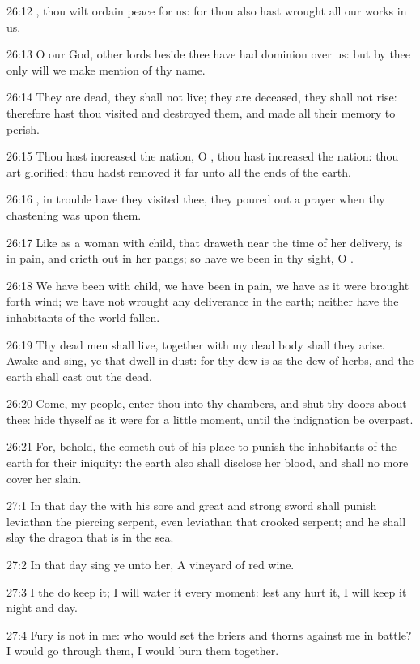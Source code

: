26:12 \LORD, thou wilt ordain peace for us: for thou also hast wrought all our works in us.

26:13 O \LORD our God, other lords beside thee have had dominion over us: but by thee only will we make mention of thy name.

26:14 They are dead, they shall not live; they are deceased, they shall not rise: therefore hast thou visited and destroyed them, and made all their memory to perish.

26:15 Thou hast increased the nation, O \LORD, thou hast increased the nation: thou art glorified: thou hadst removed it far unto all the ends of the earth.

26:16 \LORD, in trouble have they visited thee, they poured out a prayer when thy chastening was upon them.

26:17 Like as a woman with child, that draweth near the time of her delivery, is in pain, and crieth out in her pangs; so have we been in thy sight, O \LORD.

26:18 We have been with child, we have been in pain, we have as it were brought forth wind; we have not wrought any deliverance in the earth; neither have the inhabitants of the world fallen.

26:19 Thy dead men shall live, together with my dead body shall they arise. Awake and sing, ye that dwell in dust: for thy dew is as the dew of herbs, and the earth shall cast out the dead.

26:20 Come, my people, enter thou into thy chambers, and shut thy doors about thee: hide thyself as it were for a little moment, until the indignation be overpast.

26:21 For, behold, the \LORD cometh out of his place to punish the inhabitants of the earth for their iniquity: the earth also shall disclose her blood, and shall no more cover her slain.

27:1 In that day the \LORD with his sore and great and strong sword shall punish leviathan the piercing serpent, even leviathan that crooked serpent; and he shall slay the dragon that is in the sea.

27:2 In that day sing ye unto her, A vineyard of red wine.

27:3 I the \LORD do keep it; I will water it every moment: lest any hurt it, I will keep it night and day.

27:4 Fury is not in me: who would set the briers and thorns against me in battle? I would go through them, I would burn them together.

